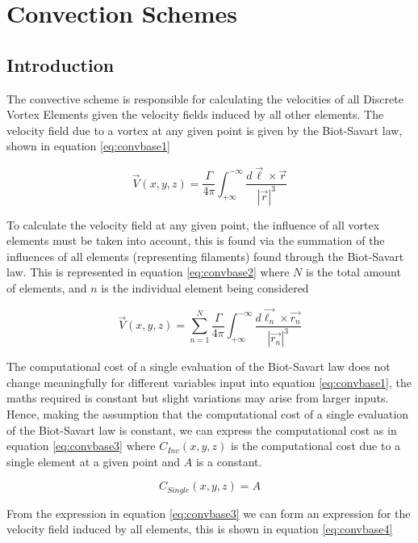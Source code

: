 
\section{Convection Schemes}
\subsection{Introduction}
The convective scheme is responsible for calculating the velocities of all Discrete Vortex Elements given the velocity fields induced by all other elements. The velocity field due to a vortex at any given point is given by the Biot-Savart law, shown in equation \ref{eq:convbase1}

\begin{equation}
\label{eq:convbase1}
\vec{V}(x,y,z)=\frac{\Gamma}{4\pi}\int_{+\infty}^{-\infty} \frac{d\vec{\ell}\times\vec{r}}{|\vec{r}|^3}
\end{equation}

To calculate the velocity field at any given point, the influence of all vortex elements must be taken into account, this is found via the summation of the influences of all elements (representing filaments) found through the Biot-Savart law. This is represented in equation \ref{eq:convbase2} where $N$ is the total amount of elements, and $n$ is the individual element being considered

\begin{equation}
\label{eq:convbase2}
\vec{V}(x,y,z)=\sum_{n=1}^{N} \frac{\Gamma}{4\pi}\int_{+\infty}^{-\infty} \frac{d\vec{\ell_n}\times\vec{r_n}}{|\vec{r_n}|^3}
\end{equation}

The computational cost of a single evaluation of the Biot-Savart law does not change meaningfully for different variables input into equation \ref{eq:convbase1}, the maths required is constant but slight variations may arise from larger inputs. Hence, making the assumption that the computational cost of a single evaluation of the Biot-Savart law is constant, we can express the computational cost as in equation \ref{eq:convbase3} where $C_{Inv}(x,y,z)$ is the computational cost due to a single element at a given point and $A$ is a constant.

\begin{equation}
\label{eq:convbase3}
C_{Single}(x,y,z)=A
\end{equation}

From the expression in equation \ref{eq:convbase3} we can form an expression for the velocity field induced by all elements, this is shown in equation \ref{eq:convbase4}

